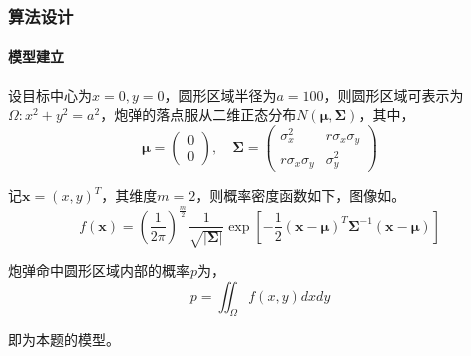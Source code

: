 \subsubsection{算法设计}

\paragraph{模型建立} 设目标中心为$x=0,y=0$，圆形区域半径为$a=100$，则圆形区域可表示为$\Omega: x^2 + y^2 = a^2$，炮弹的落点服从二维正态分布$N(\boldsymbol{\mu}, \boldsymbol{\Sigma})$，其中，
\begin{equation}
    \boldsymbol{\mu} = \left(\begin{matrix}
        0\\
        0
    \end{matrix}\right)
    , \quad 
    \boldsymbol{\Sigma}  = \left(\begin{matrix}
        \sigma_x^2 & r \sigma_x \sigma_y \\
        r \sigma_x \sigma_y & \sigma_y^2
    \end{matrix}\right)
\end{equation}

记$\boldsymbol{x} = (x,y)^T$，其维度$m=2$，则概率密度函数如下，图像如。
\begin{equation}
    f(\boldsymbol{x})=\left(\frac{1}{2 \pi}\right)^{\frac{m}{2}} \frac{1}{\sqrt{|\boldsymbol{\Sigma|}}} \exp \left[-\frac{1}{2}(\boldsymbol{x}-\boldsymbol{\mu})^{T} \boldsymbol{\Sigma}^{-1}(\boldsymbol{x}-\boldsymbol{\mu})\right]
\end{equation}

炮弹命中圆形区域内部的概率$p$为，
\begin{equation}\label{eq:ex5_model}
    p = \iint_\Omega f(x,y) dxdy
\end{equation}

即为本题的模型。

